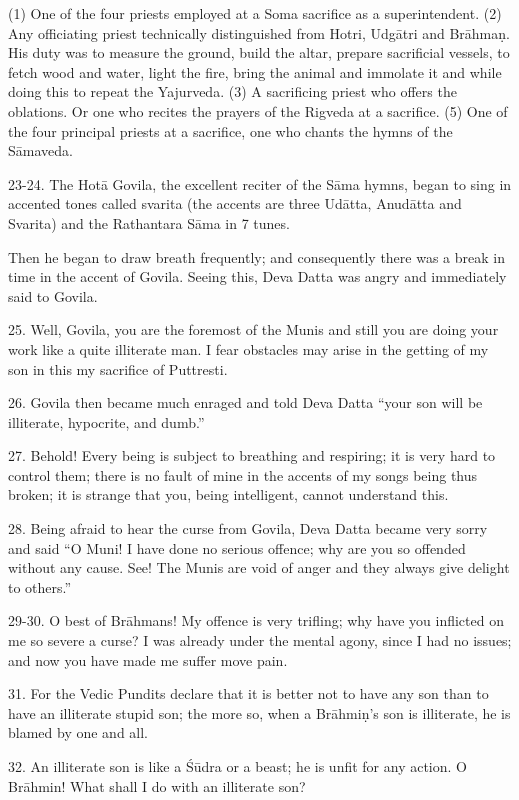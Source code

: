 (1) One of the four priests employed at a Soma sacrifice as a superintendent.
(2) Any officiating priest technically distinguished from Hotri, Udg\=atri and Br\=ahma\d{n}. His duty was to measure the ground, build the altar, prepare sacrificial vessels, to fetch wood and water, light the fire, bring the animal and immolate it and while doing this to repeat the Yajurveda.
(3) A sacrificing priest who offers the oblations. Or one who recites the prayers of the Rigveda at a sacrifice.
(5) One of the four principal priests at a sacrifice, one who chants the hymns of the S\=amaveda.

23-24. The Hot\=a Govila, the excellent reciter of the S\=ama hymns, began to sing in accented tones called svarita (the accents are three Ud\=atta, Anud\=atta and Svarita) and the Rathantara S\=ama in 7 tunes.

Then he began to draw breath frequently; and consequently there was a break in time in the accent of Govila. Seeing this, Deva Datta was angry and immediately said to Govila.

25. Well, Govila, you are the foremost of the Munis and still you are doing your work like a quite illiterate man. I fear obstacles may arise in the getting of my son in this my sacrifice of Puttresti.

26. Govila then became much enraged and told Deva Datta ``your son will be illiterate, hypocrite, and dumb.''

27. Behold! Every being is subject to breathing and respiring; it is very hard to control them; there is no fault of mine in the accents of my songs being thus broken; it is strange that you, being intelligent, cannot understand this.

28. Being afraid to hear the curse from Govila, Deva Datta became very sorry and said ``O Muni! I have done no serious offence; why are you so offended without any cause. See! The Munis are void of anger and they always give delight to others.''

29-30. O best of Br\=ahmans! My offence is very trifling; why have you inflicted on me so severe a curse? I was already under the mental agony, since I had no issues; and now you have made me suffer move pain.

31. For the Vedic Pundits declare that it is better not to have any son than to have an illiterate stupid son; the more so, when a Br\=ahmi\d{n}'s son is illiterate, he is blamed by one and all.

32. An illiterate son is like a \'S\=udra or a beast; he is unfit for any action. O Br\=ahmin! What shall I do with an illiterate son?

